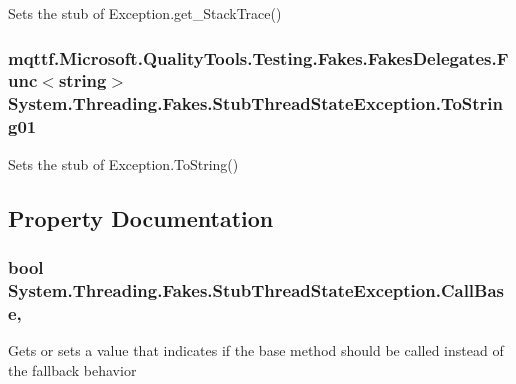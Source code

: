 Sets the stub of Exception.\-get\-\_\-\-Stack\-Trace()

\hypertarget{class_system_1_1_threading_1_1_fakes_1_1_stub_thread_state_exception_a88b5d5afcb14d91a9a4b36e7cc84b5b4}{
\subsubsection[{To\-String01}]{\setlength{\rightskip}{0pt plus 5cm}mqttf.\-Microsoft.\-Quality\-Tools.\-Testing.\-Fakes.\-Fakes\-Delegates.\-Func$<$string$>$ System.\-Threading.\-Fakes.\-Stub\-Thread\-State\-Exception.\-To\-String01}}\label{class_system_1_1_threading_1_1_fakes_1_1_stub_thread_state_exception_a88b5d5afcb14d91a9a4b36e7cc84b5b4}


Sets the stub of Exception.\-To\-String()



\subsection{Property Documentation}
\hypertarget{class_system_1_1_threading_1_1_fakes_1_1_stub_thread_state_exception_a4d2024c246d3a00978839aa5f63f015a}{
\subsubsection[{Call\-Base}]{\setlength{\rightskip}{0pt plus 5cm}bool System.\-Threading.\-Fakes.\-Stub\-Thread\-State\-Exception.\-Call\-Base\hspace{0.3cm}{\ttfamily [get]}, {\ttfamily [set]}}}\label{class_system_1_1_threading_1_1_fakes_1_1_stub_thread_state_exception_a4d2024c246d3a00978839aa5f63f015a}


Gets or sets a value that indicates if the base method should be called instead of the fallback behavior

